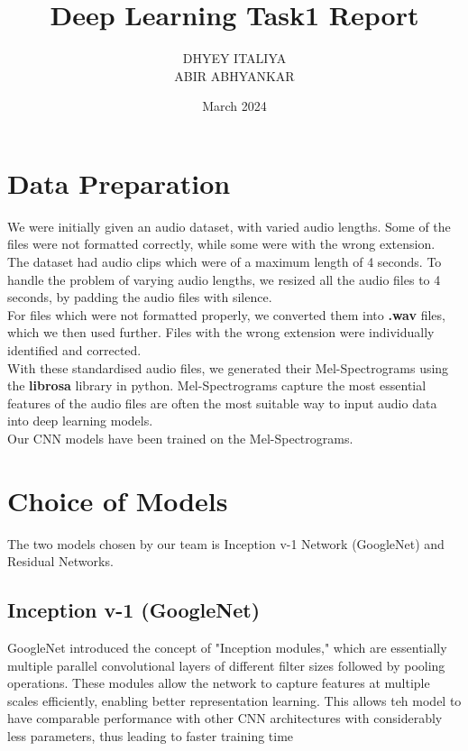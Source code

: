 \documentclass{article}
\title{Deep Learning Task1 Report}
\author{DHYEY ITALIYA\\ABIR ABHYANKAR}
\date{March 2024}
\begin{document}
\maketitle

\section{Data Preparation}
We were initially given an audio dataset, with varied audio lengths. Some of the files were not formatted correctly, while some were with the wrong extension.\\

The dataset had audio clips which were of a maximum length of 4 seconds. To handle the problem of varying audio lengths, we resized all the audio files to 4 seconds, by padding the audio files with silence.\\

For files which were not formatted properly, we converted them into \textbf{.wav} files, which we then used further. Files with the wrong extension were individually identified and corrected.\\

With these standardised audio files, we generated their Mel-Spectrograms using the \textbf{librosa} library in python. Mel-Spectrograms capture the most essential features of the audio files are often the most suitable way to input audio data into deep learning models. \\

Our CNN models have been trained on the Mel-Spectrograms.
\section{Choice of Models}
The two models chosen by our team is Inception v-1 Network (GoogleNet) and Residual Networks.
\subsection{Inception v-1 (GoogleNet)}
GoogleNet introduced the concept of "Inception modules," which are essentially multiple parallel convolutional layers of different filter sizes followed by pooling operations. These modules allow the network to capture features at multiple scales efficiently, enabling better representation learning. This allows teh model to have comparable performance with other CNN architectures with considerably less parameters, thus leading to faster training time\\
\end{document}
